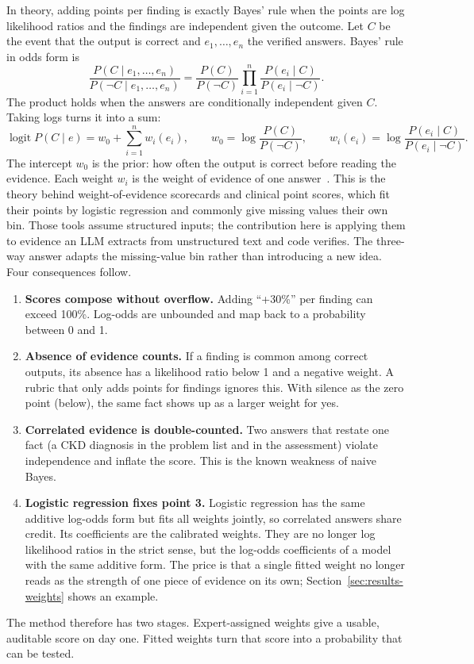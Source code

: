 \documentclass[10pt,letterpaper]{article}
\begin{document}
In theory, adding points per finding is exactly Bayes' rule when the points are log likelihood ratios and the findings are independent given the outcome. Let $C$ be the event that the output is correct and $e_1,\dots,e_n$ the verified answers. Bayes' rule in odds form is
\begin{equation}
\frac{P(C\mid e_1,\dots,e_n)}{P(\neg C\mid e_1,\dots,e_n)} = \frac{P(C)}{P(\neg C)}\prod_{i=1}^{n}\frac{P(e_i\mid C)}{P(e_i\mid \neg C)}.
\end{equation}
The product holds when the answers are conditionally independent given $C$. Taking logs turns it into a sum:
\begin{equation}
\operatorname{logit} P(C\mid e) = w_0 + \sum_{i=1}^{n} w_i(e_i),\qquad w_0=\log\frac{P(C)}{P(\neg C)},\qquad w_i(e_i)=\log\frac{P(e_i\mid C)}{P(e_i\mid\neg C)}.
\end{equation}
The intercept $w_0$ is the prior: how often the output is correct before reading the evidence. Each weight $w_i$ is the weight of evidence of one answer~\cite{good}. This is the theory behind weight-of-evidence scorecards and clinical point scores, which fit their points by logistic regression and commonly give missing values their own bin. Those tools assume structured inputs; the contribution here is applying them to evidence an LLM extracts from unstructured text and code verifies. The three-way answer adapts the missing-value bin rather than introducing a new idea. Four consequences follow.
\begin{enumerate}
  \item \textbf{Scores compose without overflow.} Adding ``+30\%'' per finding can exceed 100\%. Log-odds are unbounded and map back to a probability between 0 and 1.
  \item \textbf{Absence of evidence counts.} If a finding is common among correct outputs, its absence has a likelihood ratio below 1 and a negative weight. A rubric that only adds points for findings ignores this. With silence as the zero point (below), the same fact shows up as a larger weight for yes.
  \item \textbf{Correlated evidence is double-counted.} Two answers that restate one fact (a CKD diagnosis in the problem list and in the assessment) violate independence and inflate the score. This is the known weakness of naive Bayes.
  \item \textbf{Logistic regression fixes point 3.} Logistic regression has the same additive log-odds form but fits all weights jointly, so correlated answers share credit. Its coefficients are the calibrated weights. They are no longer log likelihood ratios in the strict sense, but the log-odds coefficients of a model with the same additive form. The price is that a single fitted weight no longer reads as the strength of one piece of evidence on its own; Section~\ref{sec:results-weights} shows an example.
\end{enumerate}
The method therefore has two stages. Expert-assigned weights give a usable, auditable score on day one. Fitted weights turn that score into a probability that can be tested.
\end{document}
